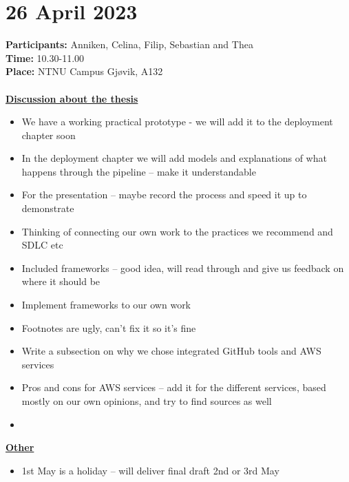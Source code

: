 \section{26 April 2023}
\textbf{Participants:} Anniken, Celina, Filip, Sebastian and Thea \\
\textbf{Time:} 10.30-11.00 \\
\textbf{Place:} NTNU Campus Gjøvik, A132
\\~\\
\textbf{\underline{Discussion about the thesis}}
\begin{itemize}
    \item We have a working practical prototype - we will add it to the deployment chapter soon 
    \item In the deployment chapter we will add models and explanations of what happens through the pipeline – make it understandable 
    \item For the presentation – maybe record the process and speed it up to demonstrate 
    \item Thinking of connecting our own work to the practices we recommend and SDLC etc 
    \item Included frameworks – good idea, will read through and give us feedback on where it should be 
    \item Implement frameworks to our own work 
    \item Footnotes are ugly, can't fix it so it's fine
    \item Write a subsection on why we chose integrated GitHub tools and AWS services 
    \item Pros and cons for AWS services – add it for the different services, based mostly on our own opinions, and try to find sources as well 
    \item 
\end{itemize}

\textbf{\underline{Other}}
\begin{itemize}
    \item 1st May is a holiday – will deliver final draft 2nd or 3rd May 
\end{itemize}